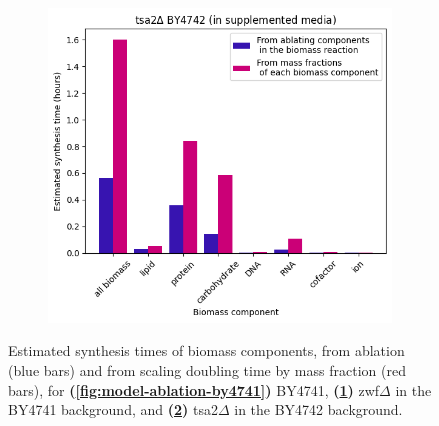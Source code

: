 \begin{figure}
\begin{subfigure}[htpb]{0.45\textwidth}
   \caption{
   }
   \label{fig:model-ablation-zwf1}
  \end{subfigure}
  \begin{subfigure}[htpb]{0.45\textwidth}
   \centering
   \includegraphics[width=\textwidth]{ablation_tsa2}
   \caption{
   }
   \label{fig:model-ablation-tsa2}
  \end{subfigure}
  \caption{
    Estimated synthesis times of biomass components, from ablation (blue bars) and from scaling doubling time by mass fraction (red bars), for \textbf{(\ref{fig:model-ablation-by4741})} BY4741, \textbf{(\ref{fig:model-ablation-zwf1})} zwf$\Delta$ in the BY4741 background, and \textbf{(\ref{fig:model-ablation-tsa2})} tsa2$\Delta$ in the BY4742 background.
  }
  \label{fig:model-ablation-strains}
\end{figure}

